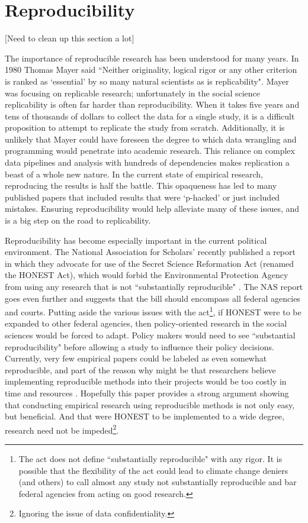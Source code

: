 \documentclass[12pt]{article}
\begin{document}
\newpage
\section{Reproducibility}
\textcolor{BrickRed}{[Need to clean up this section a lot]}

The importance of reproducible research has been understood for many years. In 1980 Thomas Mayer said ``Neither originality, logical rigor or any other criterion is ranked as `essential' by so many natural scientists as is replicability". Mayer was focusing on replicable research; unfortunately in the social science replicability is often far harder than reproducibility. When it takes five years and tens of thousands of dollars to collect the data for a single study, it is a difficult proposition to attempt to replicate the study from scratch. Additionally, it is unlikely that Mayer could have foreseen the degree to which data wrangling and programming would penetrate into academic research. This reliance on complex data pipelines and analysis with hundreds of dependencies makes replication a beast of a whole new nature. In the current state of empirical research, reproducing the results is half the battle. This opaqueness has led to many published papers that included results that were `p-hacked' or just included mistakes. Ensuring reproducibility would help alleviate many of these issues, and is a big step on the road to replicability.

Reproducibility has become especially important in the current political environment. The National Association for Scholars' recently published a report in which they advocate for use of the Secret Science Reformation Act (renamed the HONEST Act), which would forbid the Environmental Protection Agency from using any research that is not ``substantially reproducible" \cite{wired}. The NAS report goes even further and suggests that the bill should encompass all federal agencies and courts. Putting aside the various issues with the act\footnote{The act does not define ``substantially reproducible" with any rigor. It is possible that the flexibility of the act could lead to climate change deniers (and others) to call almost any study not substantially reproducible and bar federal agencies from acting on good research.}, if HONEST were to be expanded to other federal agencies, then policy-oriented research in the social sciences would be forced to adapt. Policy makers would need to see ``substantial reproducibility" before allowing a study to influence their policy decisions. Currently, very few empirical papers could be labeled as even somewhat reproducible, and part of the reason why might be that researchers believe implementing reproducible methods into their projects would be too costly in time and resources \cite{irreproducible}. Hopefully this paper provides a strong argument showing that conducting empirical research using reproducible methods is not only easy, but beneficial. And that were HONEST to be implemented to a wide degree, research need not be impeded\footnote{Ignoring the issue of data confidentiality.}.
\end{document}
